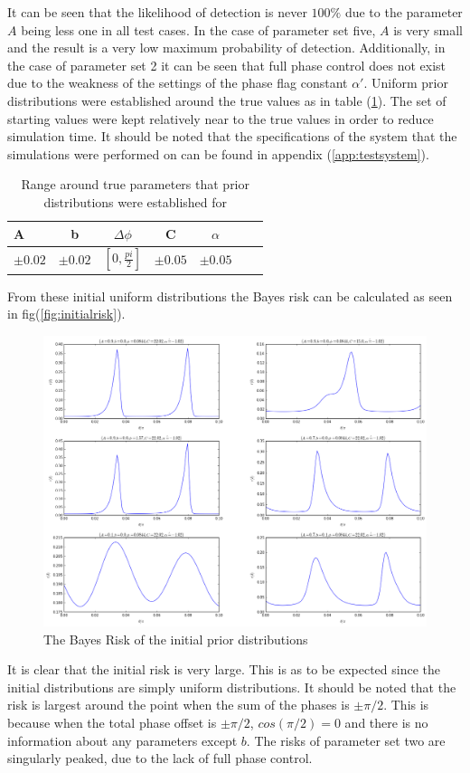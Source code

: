 It can be seen that the likelihood of detection is never $100\%$ due to the parameter $A$ being less one in all test cases. In the case of parameter set five, $A$ is very small and the result is a very low maximum probability of detection. Additionally, in the case of parameter set 2 it can be seen that full phase control does not exist due to the weakness of the settings of the phase flag constant $\alpha'$.   Uniform prior distributions were established around the true values as in table (\ref{tab:around}). The set of starting values were kept relatively near to the true values in order to reduce simulation time. It should be noted that the specifications of the system that the simulations were performed on can be found in appendix (\ref{app:testsystem}). 
\begin{table}[h]
\begin{center}
\begin{tabular}{l*{5}{c}r}
A&b& $\Delta\phi$ & C & $\alpha$ \\
\hline
 $\pm0.02$ & $\pm0.02$ & $[0,\frac{pi}{2}]$ & $\pm0.05$ & $\pm0.05$
\end{tabular}
\caption{Range around true parameters that prior distributions were established for}
\label{tab:around}
\end{center}
\end{table}
From these initial uniform distributions the Bayes risk can be calculated as seen in fig(\ref{fig:initialrisk}).
\begin{figure}[ht!]
\centering
\includegraphics[scale=0.5]{Figures/priors.png}
\caption{The Bayes Risk of the initial prior distributions}
\label{fig:initialdistributions}
\end{figure}
It is clear that the initial risk is very large. This is as to be expected since the initial distributions are simply uniform distributions. It should be noted that the risk is largest around the point when the sum of the phases is $\pm\pi/2$. This is because when the total phase offset is $\pm\pi/2$, $cos(\pi/2)=0$ and there is no information about any parameters except $b$. The risks of parameter set two are singularly peaked, due to the lack of full phase control. 

